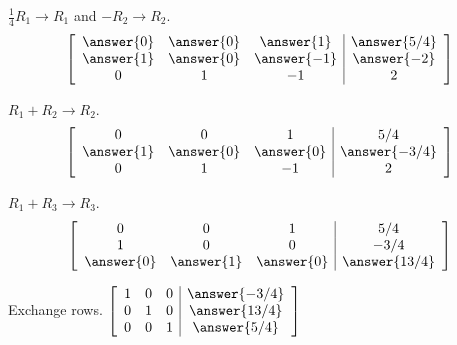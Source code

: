 \documentclass{ximera}
\begin{document}
\begin{problem}
\begin{problem}
\begin{problem}
\begin{problem}
\begin{problem}
\begin{prompt} $\frac{1}{4}R_1\rightarrow R_1$ and $-R_2\rightarrow R_2$.
$$\left[\begin{array}{ccc|c}  
\answer{0}&\answer{0}&\answer{1}&\answer{5/4}\\\answer{1}&\answer{0}&\answer{-1}&\answer{-2}\\0&1&-1&2
 \end{array}\right]$$
\end{prompt}

\begin{problem}
\begin{prompt} $R_1+R_2\rightarrow R_2$.
$$\left[\begin{array}{ccc|c}  
0&0&1&5/4\\\answer{1}&\answer{0}&\answer{0}&\answer{-3/4}\\0&1&-1&2
 \end{array}\right]$$
 \end{prompt}
 
 \begin{problem}
 \begin{prompt} $R_1+R_3\rightarrow R_3$.
$$\left[\begin{array}{ccc|c}  
0&0&1&5/4\\1&0&0&-3/4\\\answer{0}&\answer{1}&\answer{0}&\answer{13/4}
 \end{array}\right]$$
 \end{prompt}
 
 \begin{problem}
 \begin{prompt} Exchange rows.
$\left[\begin{array}{ccc|c}  
 1&0&0&\answer{-3/4}\\0&1&0&\answer{13/4}\\0&0&1&\answer{5/4}
 \end{array}\right]$
 \end{prompt}

 \end{problem}
  \end{problem}
   \end{problem}
    \end{problem}
     \end{problem}
      \end{problem}
       \end{problem}
     
        \end{problem}
\end{document}
